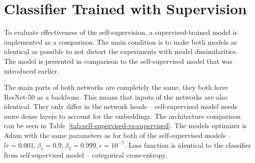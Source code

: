 \section{\label{sec:supervised-classifier}Classifier Trained with Supervision}

To evaluate effectiveness of the self-supervision, a supervised-trained model is implemented as a comparison. The main condition is to make both models as identical as possible to not distort the experiments with model dissimilarities. The model is presented in comparison to the self-supervised model that was introduced earlier.

The main parts of both networks are completely the same, they both have ResNet-50 as a backbone. This means that inputs of the networks are also identical. They only differ in the network heads -- self-supervised model needs more dense layers to account for the embeddings. The architecture comparison can be seen in Table~\ref{tab:self-supervised-vs-supervised}. The models optimizer is Adam with the same parameters as for both of the self-supervised models -- $lr = 0.001, \beta_1 = 0.9, \beta_2 = 0.999, \epsilon = 10^{-7}$. Loss function is identical to the classifier from self-supervised model -- categorical cross-entropy.

